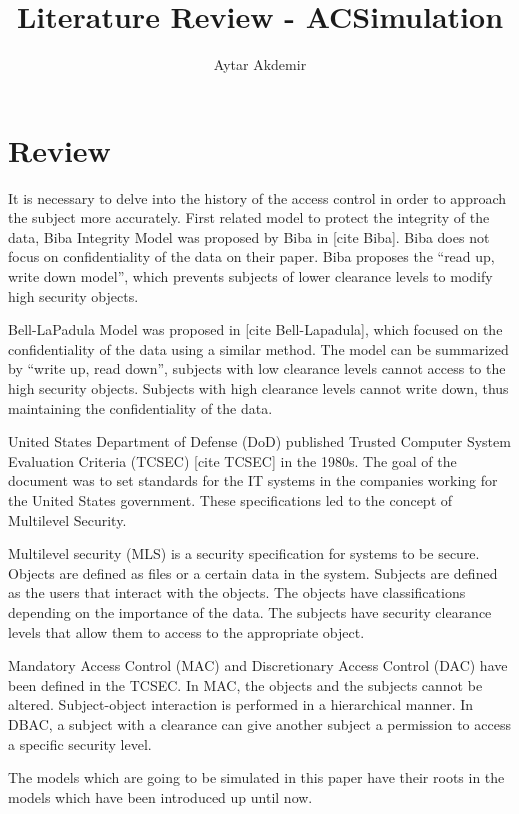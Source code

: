 \documentclass[11pt]{article} %
\title{Literature Review - ACSimulation}
\author{Aytar Akdemir}
\begin{document}
\maketitle

\section{Review}

It is necessary to delve into the history of the access control in order to approach the subject more accurately. 
First related model to protect the integrity of the data, Biba Integrity Model was proposed by Biba in [cite Biba]. 
Biba does not focus on confidentiality of the data on their paper. 
Biba proposes the ``read up, write down model'', which prevents subjects of lower clearance levels to modify high security objects.

Bell-LaPadula Model was proposed in [cite Bell-Lapadula], which focused on the confidentiality of the data using a similar method. 
The model can be summarized by ``write up, read down'', subjects with low clearance levels cannot access to the high security objects. 
Subjects with high clearance levels cannot write down, thus maintaining the confidentiality of the data.

United States Department of Defense (DoD) published Trusted Computer System Evaluation Criteria (TCSEC) [cite TCSEC] in the 1980s. 
The goal of the document was to set standards for the IT systems in the companies working for the United States government. 
These specifications led to the concept of Multilevel Security. 

Multilevel security (MLS) is a security specification for systems to be secure. 
Objects are defined as files or a certain data in the system. 
Subjects are defined as the users that interact with the objects. 
The objects have classifications depending on the importance of the data. 
The subjects have security clearance levels that allow them to access to the appropriate object.

Mandatory Access Control (MAC) and Discretionary Access Control (DAC) have been defined in the TCSEC. 
In MAC, the objects and the subjects cannot be altered.        Subject-object interaction is performed in a hierarchical manner. 
In DBAC, a subject with a clearance can give another subject a permission to access a specific security level.

The models which are going to be simulated in this paper have their roots in the models which have been introduced up until now.  
\end{document}
